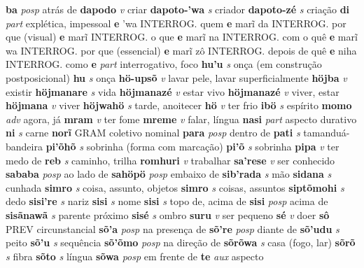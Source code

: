 \textbf{ba} \textit{posp} {atrás de}
\textbf{dapodo} \textit{v} {criar}
\textbf{dapoto-'wa} \textit{s} {criador}
\textbf{dapoto-zé} \textit{s} {criação}
\textbf{di} \textit{part} {explética, impessoal}
\textbf{e} {'wa} {INTERROG. quem}
\textbf{e} {marĩ} {da INTERROG. por que (visual)}
\textbf{e} {marĩ} {INTERROG. o que}
\textbf{e} {marĩ} {na INTERROG. com o quê}
\textbf{e} {marĩ} {wa INTERROG. por que (essencial)}
\textbf{e} {marĩ} {zô INTERROG. depois de quê}
\textbf{e} {niha} {INTERROG. como}
\textbf{e} \textit{part} {interrogativo, foco}
\textbf{hu'u} \textit{s} {onça (em construção postposicional)}
\textbf{hu} \textit{s} {onça}
\textbf{hö-upsõ} \textit{v} {lavar pele, lavar superficialmente}
\textbf{höjba} \textit{v} {existir}
\textbf{höjmanare} \textit{s} {vida}
\textbf{höjmanazé} \textit{v} {estar vivo}
\textbf{höjmanazé} \textit{v} {viver, estar}
\textbf{höjmana} \textit{v} {viver}
\textbf{höjwahö} \textit{s} {tarde, anoitecer}
\textbf{hö} \textit{v} {ter frio}
\textbf{ibö} \textit{s} {espírito}
\textbf{momo} \textit{adv} {agora, já}
\textbf{mram} \textit{v} {ter fome}
\textbf{mreme} \textit{v} {falar, língua}
\textbf{nasi} \textit{part} {aspecto durativo}
\textbf{ni} \textit{s} {carne}
\textbf{norĩ} {GRAM} {coletivo nominal}
\textbf{para} \textit{posp} {dentro de}
\textbf{pati} \textit{s} {tamanduá-bandeira}
\textbf{pi'õhõ} \textit{s} {sobrinha (forma com marcação)}
\textbf{pi'õ} \textit{s} {sobrinha}
\textbf{pipa} \textit{v} {ter medo de}
\textbf{reb} \textit{s} {caminho, trilha}
\textbf{romhuri} \textit{v} {trabalhar}
\textbf{sa'rese} \textit{v} {ser conhecido}
\textbf{sababa} \textit{posp} {ao lado de}
\textbf{sahöpö} \textit{posp} {embaixo de}
\textbf{sib'rada} \textit{s} {mão}
\textbf{sidana} \textit{s} {cunhada}
\textbf{simro} \textit{s} {coisa, assunto, objetos}
\textbf{simro} \textit{s} {coisas, assuntos}
\textbf{siptõmohi} \textit{s} {dedo}
\textbf{sisi're} \textit{s} {nariz}
\textbf{sisi} \textit{s} {nome}
\textbf{sisi} \textit{s} {topo de, acima de}
\textbf{sisi} \textit{posp} {acima de}
\textbf{sisãnawã} \textit{s} {parente próximo}
\textbf{sisé} \textit{s} {ombro}
\textbf{suru} \textit{v} {ser pequeno}
\textbf{sé} \textit{v} {doer}
\textbf{sô} {PREV} {circunstancial}
\textbf{sõ'a} \textit{posp} {na presença de}
\textbf{sõ're} \textit{posp} {diante de}
\textbf{sõ'udu} \textit{s} {peito}
\textbf{sõ'u} \textit{s} {sequência}
\textbf{sõ'õmo} \textit{posp} {na direção de}
\textbf{sõrõwa} \textit{s} {casa (fogo, lar)}
\textbf{sõrõ} \textit{s} {fibra}
\textbf{sõto} \textit{s} {língua}
\textbf{sõwa} \textit{posp} {em frente de}
\textbf{te} \textit{aux} {aspecto}
